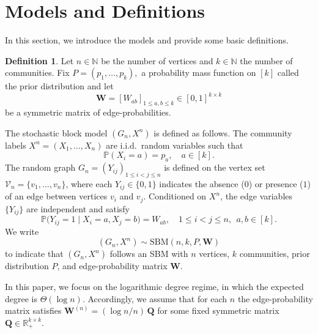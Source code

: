 \documentclass[11pt]{article}
\theoremstyle{plain}
\theoremstyle{definition}
\newtheorem{definition}[theorem]{Definition}
\begin{document}
\section{Models and Definitions}\label{sec:model} In this section, we introduce the models and provide some basic definitions.
\begin{definition}
    Let $n\in\mathbb{N}$ be the number of vertices and $k\in\mathbb{N}$ the number of communities.  Fix
\(
P= (p_1,\dots,p_k),
\) {a probability mass function on } $[k]$ called the prior distribution
and let 
\[
\mathbf{W} = [W_{ab}]_{1\le a,b\le k}\in[0,1]^{k\times k}
\]
be a symmetric matrix of edge-probabilities.


{The stochastic block model} $(G_n,X^n)$ is defined as follows. The community labels
  $X^n = (X_1,\dots,X_n)$ are i.i.d.\ random variables such that 
  \[
    \mathbb{P}(X_i = a) = p_a,\quad a\in[k].
  \]
  The random graph
  $G_n = (Y_{ij})_{1\le i<j\le n}$ is defined on the vertex set 
  $\mathcal V_n = \{v_1,\dots,v_n\}$, where each
  $Y_{ij}\in\{0,1\}$ indicates the absence ($0$) or presence ($1$) of an edge between vertices $v_i$ and $v_j$.
  Conditioned on $X^n$, the edge variables $\{Y_{ij}\}$ are independent and satisfy
  \[
    \mathbb{P}\bigl(Y_{ij}=1 \mid X_i = a, X_j = b\bigr)
    =
    W_{ab}, 
    \quad
    1\le i<j\le n,\ \ a,b\in[k].
  \]
  We write 
\[(G_n,X^n)\sim \mathrm{SBM}(n,k,P,\mathbf{W})\] 
to indicate that $(G_n,X^n)$ follows an SBM with $n$ vertices, $k$ communities, prior distribution $P$, and edge-probability matrix $\mathbf{W}$.
\end{definition}
In this paper, we focus on the logarithmic degree regime, in which the expected degree is $\Theta(\log n)$. Accordingly, we assume that for each $n$ the edge-probability matrix satisfies $\mathbf{W}^{(n)}=({\log n}/{n})\,\mathbf{Q}$ for some fixed symmetric matrix $\mathbf{Q}\in \mathbb{R}_+^{k\times k}$.
\end{document}
